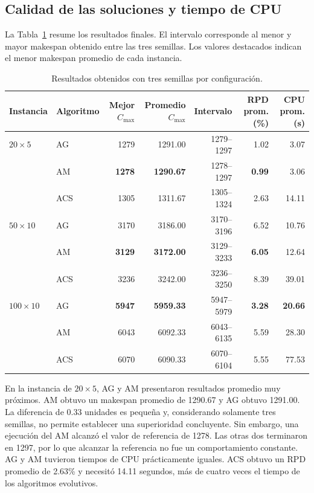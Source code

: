 \documentclass[journal]{IEEEtran}
\begin{document}
\subsection{Calidad de las soluciones y tiempo de CPU}

La Tabla~\ref{tab:resultados} resume los resultados finales. El intervalo corresponde al menor y mayor makespan obtenido entre las tres semillas. Los valores destacados indican el menor makespan promedio de cada instancia.

\begin{table}[t]
\caption{Resultados obtenidos con tres semillas por configuración.}
\label{tab:resultados}
\centering
\footnotesize
\begin{tabular}{@{}llrrrrr@{}}
\toprule
Instancia & Algoritmo & Mejor $C_{\max}$ & Promedio $C_{\max}$ & Intervalo & RPD prom. (\%) & CPU prom. (s)\\
\midrule
$20\times5$ & AG  & 1279 & 1291.00 & 1279--1297 & 1.02 & 3.07\\
             & AM  & \textbf{1278} & \textbf{1290.67} & 1278--1297 & \textbf{0.99} & 3.06\\
             & ACS & 1305 & 1311.67 & 1305--1324 & 2.63 & 14.11\\
\midrule
$50\times10$ & AG  & 3170 & 3186.00 & 3170--3196 & 6.52 & 10.76\\
              & AM  & \textbf{3129} & \textbf{3172.00} & 3129--3233 & \textbf{6.05} & 12.64\\
              & ACS & 3236 & 3242.00 & 3236--3250 & 8.39 & 39.01\\
\midrule
$100\times10$ & AG  & \textbf{5947} & \textbf{5959.33} & 5947--5979 & \textbf{3.28} & \textbf{20.66}\\
               & AM  & 6043 & 6092.33 & 6043--6135 & 5.59 & 28.30\\
               & ACS & 6070 & 6090.33 & 6070--6104 & 5.55 & 77.53\\
\bottomrule
\end{tabular}
\end{table}

En la instancia de $20\times5$, AG y AM presentaron resultados promedio muy próximos. AM obtuvo un makespan promedio de 1290.67 y AG obtuvo 1291.00. La diferencia de 0.33 unidades es pequeña y, considerando solamente tres semillas, no permite establecer una superioridad concluyente. Sin embargo, una ejecución del AM alcanzó el valor de referencia de 1278. Las otras dos terminaron en 1297, por lo que alcanzar la referencia no fue un comportamiento constante. AG y AM tuvieron tiempos de CPU prácticamente iguales. ACS obtuvo un RPD promedio de 2.63\% y necesitó 14.11 segundos, más de cuatro veces el tiempo de los algoritmos evolutivos.
\end{document}
